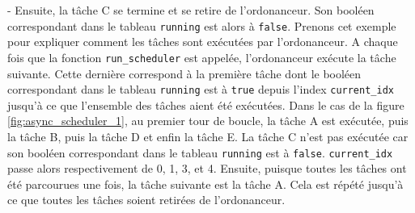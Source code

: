 - Ensuite, la tâche C se termine et se retire de l'ordonanceur. Son booléen correspondant dans
le tableau \texttt{running} est alors à \texttt{false}. Prenons cet exemple pour expliquer
comment les tâches sont exécutées par l'ordonanceur. A chaque fois que la fonction
\texttt{run\_scheduler} est appelée, l'ordonanceur exécute la tâche suivante. Cette dernière
correspond à la première tâche dont le booléen correspondant dans le tableau \texttt{running}
est à \texttt{true} depuis l'index \texttt{current\_idx} jusqu'à ce que l'ensemble des
tâches aient été exécutées. Dans le cas de la figure \ref{fig:async_scheduler_1}, au premier
tour de boucle, la tâche A est exécutée, puis la tâche B, puis la tâche D et enfin la tâche E.
La tâche C n'est pas exécutée car son booléen correspondant dans le tableau \texttt{running}
est à \texttt{false}. \texttt{current\_idx} passe alors respectivement de 0, 1, 3, et 4.
Ensuite, puisque toutes les tâches ont été parcourues une fois, la tâche suivante est la tâche
A. Cela est répété jusqu'à ce que toutes les tâches soient retirées de l'ordonanceur.

